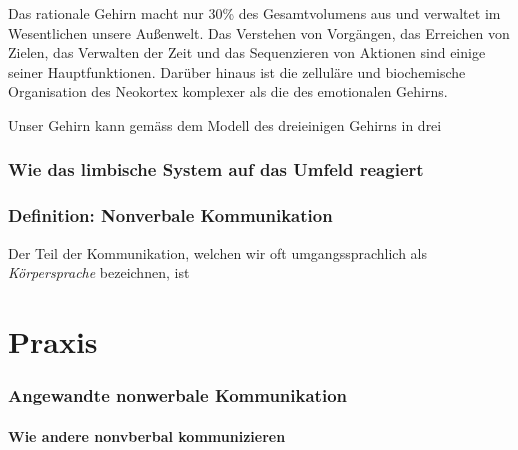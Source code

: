 \documentclass[
    invert-title=false,
    titlepage=true,
    titleimage-ratio=1011,
    parskip=half-,
]{bfhpub}                %
\begin{document}
    Das rationale Gehirn macht nur 30\% des Gesamtvolumens aus und verwaltet im Wesentlichen unsere Außenwelt.
    Das Verstehen von Vorgängen, das Erreichen von Zielen, das Verwalten der Zeit und das Sequenzieren von Aktionen sind einige seiner Hauptfunktionen.
    Darüber hinaus ist die zelluläre und biochemische Organisation des Neokortex komplexer als die des emotionalen Gehirns.


    \begin{bfhNoteBox}
        Unser Gehirn kann gemäss dem Modell des dreieinigen Gehirns in drei
    \end{bfhNoteBox}


    \section{Wie das limbische System auf das Umfeld reagiert}\label{sec:die-reaktionen-des-limbischen-systems}
    



    \section{Definition: Nonverbale Kommunikation}
    Der Teil der Kommunikation, welchen wir oft umgangssprachlich als \textit{Körpersprache} bezeichnen, ist

    \part{Praxis}

    \section{Angewandte nonwerbale Kommunikation}

    \subsection{Wie andere nonvberbal kommunizieren}
\end{document}
